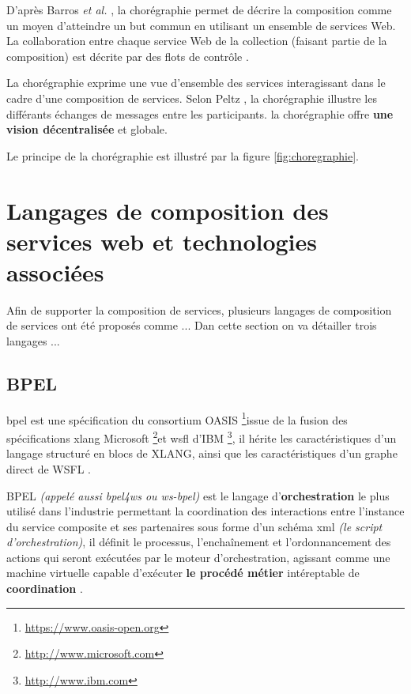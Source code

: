         D'après Barros \emph{et al.} \cite{barros2006standards}, la
        chorégraphie permet de décrire la composition comme un moyen
        d'atteindre un but commun en utilisant un ensemble de services
        Web. La collaboration entre chaque service Web de la
        collection (faisant partie de la composition) est décrite par
        des flots de contrôle \cite{lopez2008selection}.

        La chorégraphie exprime une vue d'ensemble des services
        interagissant dans le cadre d'une composition de
        services. Selon Peltz \cite{peltz2003web}, la chorégraphie
        illustre les différants échanges de messages entre les
        participants. la chorégraphie offre \textbf{une vision
          décentralisée} et globale.

        Le principe de la chorégraphie est illustré par la figure
        \ref{fig:choregraphie}.
        

  \section{Langages de composition des services web et
    technologies associées}
  \label{sec:lang-de-comp}
  Afin de supporter la composition de services, plusieurs langages de
  composition de services ont été proposés comme ...  Dan cette
  section on va détailler trois langages ... \cite{lopez2008selection}

    \subsection{BPEL}
    \label{sec:bpel}

    \acrshort{bpel} est une spécification du consortium OASIS
    \footnote{\url{https://www.oasis-open.org}}issue de la fusion des
    spécifications \acrshort{xlang} Microsoft
    \footnote{\url{http://www.microsoft.com}}et \acrshort{wsfl} d'IBM
    \footnote{\url{http://www.ibm.com}}, il hérite les
    caractéristiques d'un langage structuré en blocs de
    \textsc{XLANG}, ainsi que les caractéristiques d'un graphe direct
    de WSFL \cite{driss2011approche}.

    

    \textsc{BPEL} \textit{(appelé aussi \acrshort{bpel4ws} ou
      \acrshort{ws-bpel})} est le langage d'\textbf{orchestration}
    le plus utilisé dans l'industrie permettant la coordination des
    interactions entre l'instance du service composite et ses
    partenaires sous forme d'un schéma \acrshort{xml} \textit{(le
      script d'orchestration)}, il définit le processus,
    l'enchaînement et l'ordonnancement des actions qui seront
    exécutées par le moteur d'orchestration, agissant comme une
    machine virtuelle capable d'exécuter \textbf{le procédé métier}
    intéreptable de \textbf{coordination} \cite{chollet2009orchestration}.

